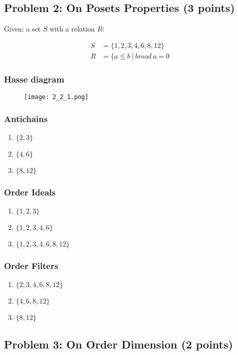 \subsection{Problem 2: On Posets Properties (3 points)}

Given: a set $S$ with a relation $R$:

\begin{align*}
S &= \{1,2,3,4,6,8,12\} \\
R &= \{ a \leq b\ |\ b mod\ a = 0
\end{align*}

\subsubsection{Hasse diagram}

\begin{figure}[h]
\centering
\texttt{[image: 2\_2\_1.png]}
\end{figure}

\subsubsection{Antichains} 
\begin{enumerate}
\item $\{2,3\}$
\item $\{4,6\}$
\item $\{8,12\}$
\end{enumerate}
\subsubsection{Order Ideals}
\begin{enumerate}
\item $\{1,2,3\}$
\item $\{1,2,3,4,6\}$
\item $\{1,2,3,4,6,8,12\}$
\end{enumerate}
\subsubsection{Order Filters}
\begin{enumerate}
\item $\{2,3,4,6,8,12\}$
\item $\{4,6,8,12\}$
\item $\{8,12\}$
\end{enumerate}

\subsection{Problem 3: On Order Dimension (2 points)}

